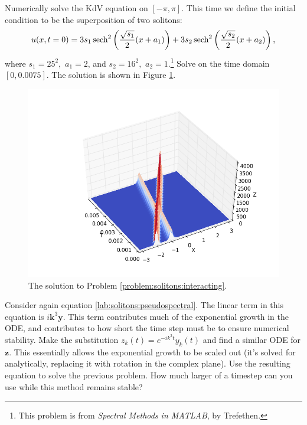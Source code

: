 \begin{problem}
Numerically solve the KdV equation on $[-\pi,\pi]$.
This time we define the initial condition 
to be the superposition of two solitons:
\[
u(x,t=0) = 3s_1\operatorname{sech}^2\left(\frac{\sqrt{s_1}}{2}(x+a_1)\right) + 3s_2\operatorname{sech}^2\left(\frac{\sqrt{s_2}}{2}(x+a_2)\right),
\]
where $s_1 = 25^2,$ $a_1 = 2$, and $s_2 = 16^2,$ $a_2 = 1$.\footnote{This problem is from \textit{Spectral Methods in MATLAB}, by Trefethen.}
Solve on the time domain $[0,0.0075]$.
The solution is shown in Figure \ref{fig:solitons:interacting}.
\label{problem:solitons:interacting}
\end{problem}

\begin{figure}[H]
\centering
\includegraphics[width=\textwidth]{figures/interacting_solitons.png}
\caption{The solution to Problem \ref{problem:solitons:interacting}.}
\label{fig:solitons:interacting}
\end{figure}

\begin{problem}
Consider again equation \eqref{lab:solitons:pseudospectral}.
The linear term in this equation is $i\mathbf{k}^3\mathbf{y}$.
This term contributes much of the exponential growth in the ODE, and contributes to how short the time step must be to ensure numerical stability.
Make the substitution $z_k(t) = e^{-ik^3t}y_k(t)$ and find a similar ODE for $\mathbf{z}$.
This essentially allows the exponential growth to be scaled out (it's solved for analytically, replacing it with rotation in the complex plane).
Use the resulting equation to solve the previous problem.
How much larger of a timestep can you use while this method remains stable?
\end{problem}